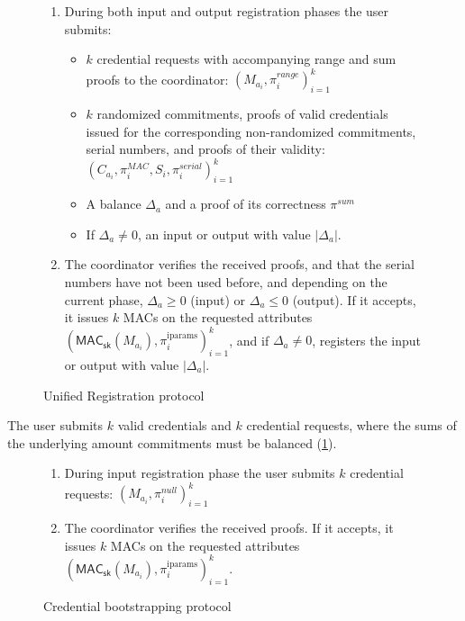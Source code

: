 \documentclass[a4paper]{article}
\begin{document}
\begin{figure}[h!]
    \begin{mdframed}
    \begin{enumerate}
        \item During both input and output registration phases the user submits:
        \begin{itemize}
            \item $k$ credential requests with accompanying range and sum proofs to the coordinator:  $(M_{a_i},\pi^{\textit{range}}_{i})^{k}_{i=1}$
            \item $k$ randomized commitments, proofs of valid credentials issued for the corresponding non-randomized commitments, serial numbers, and proofs of their validity: $(C_{a_i},\pi_{i}^{\mathit{MAC}},S_i,\pi_i^{\textit{serial}})^{k}_{i=1}$
            \item A balance $\Delta_{a}$ and a proof of its correctness $\pi^{\textit{sum}}$
            \item If $\Delta_{a} \ne 0$, an input or output with value $|\Delta_{a}|$.
        \end{itemize}
        \item The coordinator verifies the received proofs, and that the serial numbers have not been used before, and depending on the current phase, $\Delta_{a} \geq 0$ (input) or $\Delta_{a} \leq 0$ (output). If it accepts, it issues $k$ MACs on the requested attributes $(\mathsf{MAC}_\mathsf{sk}(M_{a_i}), \pi_i^{\mathrm{iparams}})^{k}_{i=1}$, and if $\Delta_{a} \ne 0$, registers the input or output with value $|\Delta_{a}|$.
    \end{enumerate}
    \end{mdframed}
    \caption{Unified Registration protocol}
    \label{fig:reissue}
\end{figure}

The user submits $k$ valid credentials and $k$ credential requests, where the sums of the underlying amount commitments must be balanced (\cref{fig:reissue}).

\begin{figure}[h!]
  \begin{mdframed}
    \begin{enumerate}
    \item During input registration phase the user submits $k$ credential requests:  $(M_{a_i},\pi^{\mathit{null}}_{i})^{k}_{i=1}$
    \item The coordinator verifies the received proofs. If it accepts, it issues $k$ MACs on the requested attributes $(\mathsf{MAC}_\mathsf{sk}(M_{a_i}), \pi_i^{\mathrm{iparams}})^{k}_{i=1}$.
    \end{enumerate}
  \end{mdframed}
  \caption{Credential bootstrapping protocol}
  \label{fig:bootstrap}
\end{figure}
\end{document}
